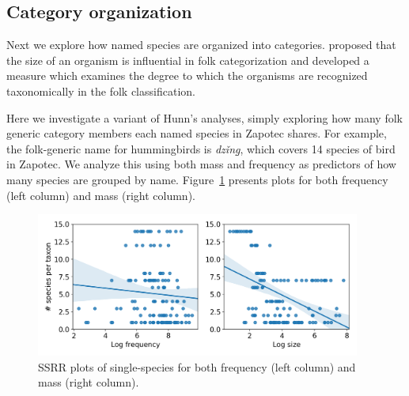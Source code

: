 \documentclass[10pt,letterpaper]{article}
\begin{document}


\subsection{Category organization}



Next we explore how named species are organized into categories.  proposed that the size of an organism is influential in folk categorization and developed a measure which examines the degree to which the organisms are recognized taxonomically in the folk classification. 

Here we investigate a variant of Hunn's analyses, simply exploring how many folk generic category members each named species in Zapotec shares. For example, the folk-generic name for hummingbirds is \textit{dz\v{i}n\b{g}}, which covers 14 species of bird in Zapotec. We analyze this using both mass and frequency as predictors of how many species are grouped by name. Figure~\ref{fig-ssrr} presents plots for both frequency (left column) and mass (right column).

\begin{figure}[!ht]
  \begin{center}
    \includegraphics[width=0.95\textwidth]{./figures/ssrr-singlespecies.png}
        \caption{SSRR plots of single-species for both frequency (left column) and mass (right column).}
        \label{fig-ssrr}
  \end{center}
\end{figure}
\end{document}
